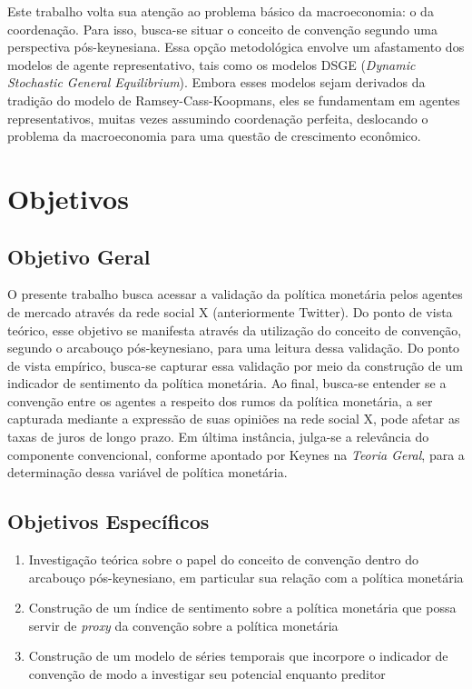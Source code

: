 Este trabalho volta sua atenção ao problema básico da macroeconomia: o da coordenação. Para isso, busca-se situar o conceito de convenção segundo uma perspectiva pós-keynesiana. Essa opção metodológica envolve um afastamento dos modelos de agente representativo, tais como os modelos DSGE (\textit{Dynamic Stochastic General Equilibrium}). Embora esses modelos sejam derivados da tradição do modelo de Ramsey-Cass-Koopmans, eles se fundamentam em agentes representativos, muitas vezes assumindo coordenação perfeita, deslocando o problema da macroeconomia para uma questão de crescimento econômico. 

\clearpage



\section{Objetivos}

\subsection{Objetivo Geral}

O presente trabalho busca acessar a validação da política monetária pelos agentes de mercado através da rede social X (anteriormente Twitter). Do ponto de vista teórico, esse objetivo se manifesta através da utilização do conceito de convenção, segundo o arcabouço pós-keynesiano, para uma leitura dessa validação. Do ponto de vista empírico, busca-se capturar essa validação por meio da construção de um indicador de sentimento da política monetária. Ao final, busca-se entender se a convenção entre os agentes a respeito dos rumos da política monetária, a ser capturada mediante a expressão de suas opiniões na rede social X, pode afetar as taxas de juros de longo prazo. Em última instância, julga-se a relevância do componente convencional, conforme apontado por Keynes na \textit{Teoria Geral}, para a determinação dessa variável de política monetária. 


\subsection{Objetivos Específicos}


\bigskip
\begin{enumerate}

\item Investigação teórica sobre o papel do conceito de convenção dentro do arcabouço pós-keynesiano, em particular sua relação com a política monetária
\bigskip
\item Construção de um índice de sentimento sobre a política monetária que possa servir de \textit{proxy} da convenção sobre a política monetária
\bigskip
\item Construção de um modelo de séries temporais que incorpore o indicador de convenção de modo a investigar seu potencial enquanto preditor

\end{enumerate}




